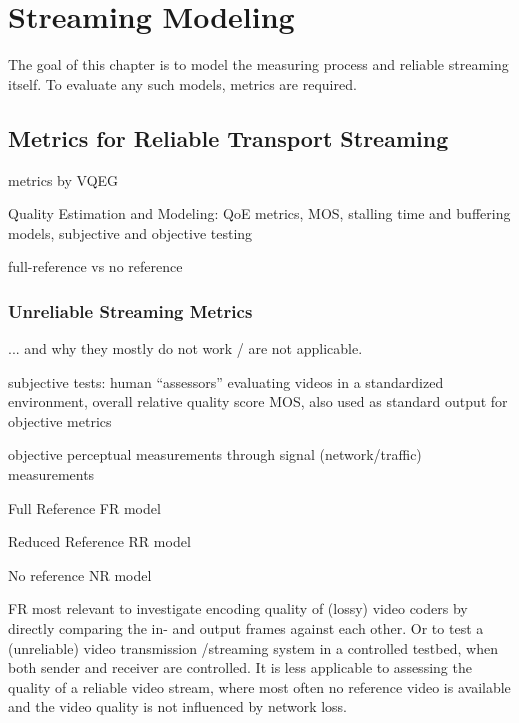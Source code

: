\section{Streaming Modeling}
\label{c3:sec:modeling}

The goal of this chapter is to model the measuring process and reliable streaming itself.
To evaluate any such models, metrics are required.

\subsection{Metrics for Reliable Transport Streaming}
\label{c3:metrics}

\cite{ituJ144}

\cite{ituG1080}

metrics by \gls{VQEG}

Quality Estimation and Modeling: QoE metrics, MOS, stalling time and buffering models, subjective and objective testing

full-reference vs no reference

\subsubsection{Unreliable Streaming Metrics}
... and why they mostly do not work / are not applicable.

subjective tests: human ``assessors'' evaluating videos in a standardized environment, overall relative quality score \gls{MOS}, also used as standard output for objective metrics

objective perceptual measurements through signal (network/traffic) measurements

Full Reference FR model

Reduced Reference RR model

No reference NR model

FR most relevant to investigate encoding quality of (lossy) video coders by directly comparing the in- and output frames against each other. Or to test a (unreliable) video transmission /streaming system in a controlled testbed, when both sender and receiver are controlled. It is less applicable to assessing the quality of a reliable video stream, where most often no reference video is available and the video quality is not influenced by network loss.


